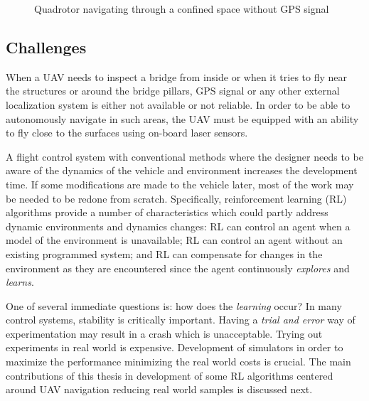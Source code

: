 \documentclass[12pt]{report}
\begin{document}
\begin{figure}[htp]
	\centering
	\caption {Quadrotor navigating through a confined space without GPS signal}
   \label{fig:motivation}
\end{figure}

\subsection{Challenges}
When a UAV needs to inspect a bridge from inside or when it tries to fly near the structures or around the bridge pillars, GPS signal or any other external localization system is either not available or not reliable. In order to be able to autonomously navigate in such areas, the UAV must be equipped with an ability to fly close to the surfaces using on-board laser sensors.\par
A flight control system with conventional methods where the designer needs to be aware of the dynamics of the vehicle and environment increases the development time. If some modifications are made to the vehicle later, most of the work may be needed to be redone from scratch. Specifically, reinforcement learning (RL) algorithms provide a number of characteristics which
could partly address dynamic environments and dynamics changes: RL can control
an agent when a model of the environment is unavailable; RL can control an agent without an
existing programmed system; and RL can compensate for changes in the environment
as they are encountered since the agent continuously \textit{explores} and \textit{learns}.

One of several immediate questions is: how does the \textit{learning} occur? In many control systems, stability is critically important. Having a \textit{trial and error} way of experimentation may result in a crash which is unacceptable. Trying out experiments in real world is expensive. Development of simulators in order to maximize the performance minimizing the real world costs is crucial. The main contributions of this thesis in development of some RL algorithms centered around UAV navigation reducing real world samples is discussed next.
\end{document}
